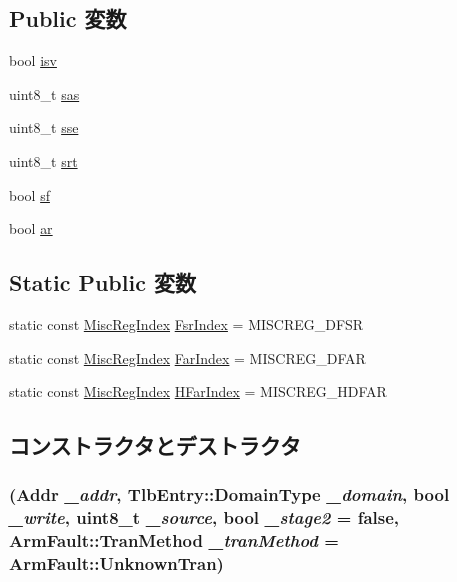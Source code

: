 \subsection*{Public 変数}
\begin{DoxyCompactItemize}
\item 
bool \hyperlink{classArmISA_1_1DataAbort_ab98211392ddb1f356f10c5688f55ec06}{isv}
\item 
uint8\_\-t \hyperlink{classArmISA_1_1DataAbort_a1186084bdb2d7947ab58dac309bb3557}{sas}
\item 
uint8\_\-t \hyperlink{classArmISA_1_1DataAbort_abba3874a6247f0df00a9dcc659cc2d67}{sse}
\item 
uint8\_\-t \hyperlink{classArmISA_1_1DataAbort_a46e1e6d22b710c280f39d97cb7ea8de9}{srt}
\item 
bool \hyperlink{classArmISA_1_1DataAbort_a9da2d5806018a5e01c9898d9c751ebb6}{sf}
\item 
bool \hyperlink{classArmISA_1_1DataAbort_a3fd520eea10c5d7eb8490a0f8a53dc0b}{ar}
\end{DoxyCompactItemize}
\subsection*{Static Public 変数}
\begin{DoxyCompactItemize}
\item 
static const \hyperlink{namespaceArmISA_a1e522017e015d4c7efd6b2360143aa67}{MiscRegIndex} \hyperlink{classArmISA_1_1DataAbort_a0fc945049ae4ebc86b2c2765b65ab5c8}{FsrIndex} = MISCREG\_\-DFSR
\item 
static const \hyperlink{namespaceArmISA_a1e522017e015d4c7efd6b2360143aa67}{MiscRegIndex} \hyperlink{classArmISA_1_1DataAbort_a3c751f200a61047c7edace6f38db43aa}{FarIndex} = MISCREG\_\-DFAR
\item 
static const \hyperlink{namespaceArmISA_a1e522017e015d4c7efd6b2360143aa67}{MiscRegIndex} \hyperlink{classArmISA_1_1DataAbort_adf1eccd205afd5770084542cc2295d6c}{HFarIndex} = MISCREG\_\-HDFAR
\end{DoxyCompactItemize}


\subsection{コンストラクタとデストラクタ}
\hypertarget{classArmISA_1_1DataAbort_aca4861c0042d8fa8b6d71b89d1ebe0e6}{
\subsubsection[{DataAbort}]{ ({\bf Addr} {\em \_\-addr}, \/  {\bf TlbEntry::DomainType} {\em \_\-domain}, \/  bool {\em \_\-write}, \/  uint8\_\-t {\em \_\-source}, \/  bool {\em \_\-stage2} = {\ttfamily false}, \/  {\bf ArmFault::TranMethod} {\em \_\-tranMethod} = {\ttfamily ArmFault::UnknownTran})}}
\label{classArmISA_1_1DataAbort_aca4861c0042d8fa8b6d71b89d1ebe0e6}



